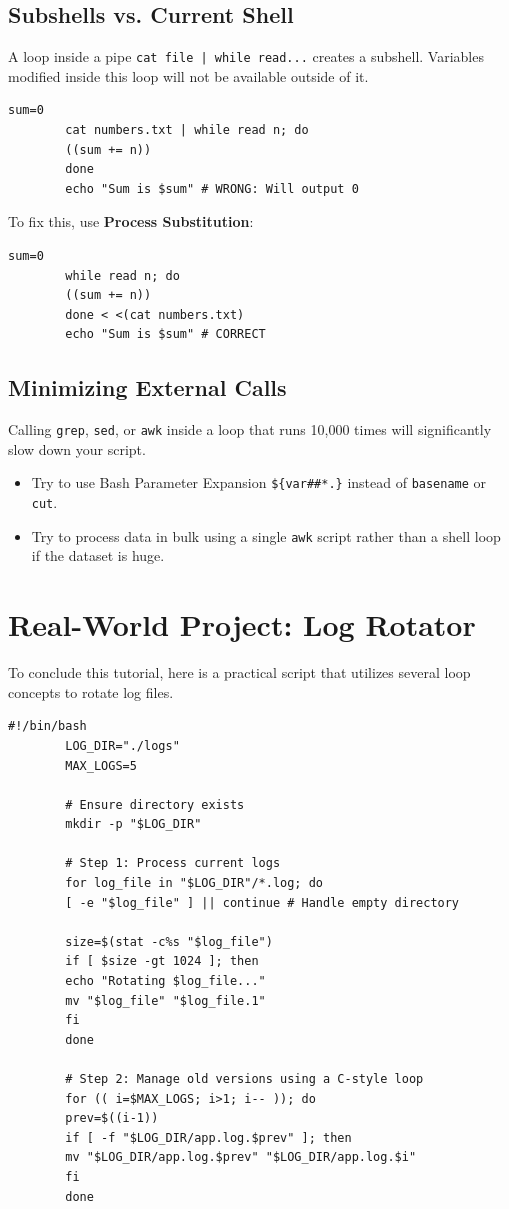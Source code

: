 \documentclass[12pt,a4paper]{article}
\begin{document}
	\subsection{Subshells vs. Current Shell}
	A loop inside a pipe \texttt{cat file | while read...} creates a subshell. Variables modified inside this loop will not be available outside of it.
	
	\begin{lstlisting}[caption=Subshell variable pitfall]
		sum=0
		cat numbers.txt | while read n; do
		((sum += n))
		done
		echo "Sum is $sum" # WRONG: Will output 0
	\end{lstlisting}
	
	To fix this, use \textbf{Process Substitution}:
	\begin{lstlisting}[caption=Fixing subshell issues]
		sum=0
		while read n; do
		((sum += n))
		done < <(cat numbers.txt)
		echo "Sum is $sum" # CORRECT
	\end{lstlisting}
	
	\subsection{Minimizing External Calls}
	Calling \texttt{grep}, \texttt{sed}, or \texttt{awk} inside a loop that runs 10,000 times will significantly slow down your script. 
	\begin{itemize}
		\item Try to use Bash Parameter Expansion \texttt{\$\{var\#\#*.\}} instead of \texttt{basename} or \texttt{cut}.
		\item Try to process data in bulk using a single \texttt{awk} script rather than a shell loop if the dataset is huge.
	\end{itemize}
	
	\section{Real-World Project: Log Rotator}
	To conclude this tutorial, here is a practical script that utilizes several loop concepts to rotate log files.
	
	\begin{lstlisting}[caption=Final Project: Simple Log Rotator]
		#!/bin/bash
		LOG_DIR="./logs"
		MAX_LOGS=5
		
		# Ensure directory exists
		mkdir -p "$LOG_DIR"
		
		# Step 1: Process current logs
		for log_file in "$LOG_DIR"/*.log; do
		[ -e "$log_file" ] || continue # Handle empty directory
		
		size=$(stat -c%s "$log_file")
		if [ $size -gt 1024 ]; then
		echo "Rotating $log_file..."
		mv "$log_file" "$log_file.1"
		fi
		done
		
		# Step 2: Manage old versions using a C-style loop
		for (( i=$MAX_LOGS; i>1; i-- )); do
		prev=$((i-1))
		if [ -f "$LOG_DIR/app.log.$prev" ]; then
		mv "$LOG_DIR/app.log.$prev" "$LOG_DIR/app.log.$i"
		fi
		done
	\end{lstlisting}
	
\end{document}
